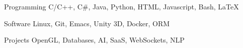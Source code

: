 

\begin{cvskills}

  \cvskill
    {Programming} %
    {C/C++, C\#, Java, Python, HTML, Javascript, Bash, LaTeX}

  \cvskill
    {Software} %
    {Linux, Git, Emacs, Unity 3D, Docker, ORM} %

  \cvskill
    {Projects} %
    {OpenGL, Databases, AI, SaaS, WebSockets, NLP} %


\end{cvskills}
